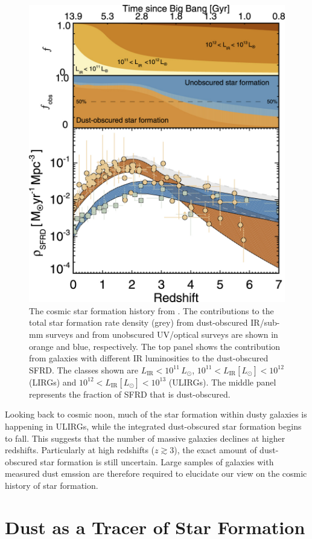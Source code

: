 \begin{figure}
    \centering
	\includegraphics[width=0.75\columnwidth]{Figures/cosmic_sfrd.jpeg}
	\caption{The cosmic star formation history from \citealt{Zavala_2021}. The contributions to the total star formation rate density (grey) from dust-obscured IR/sub-mm surveys and from unobscured UV/optical surveys are shown in orange and blue, respectively. The top panel shows the contribution from galaxies with different IR luminosities to the dust-obscured SFRD. The classes shown are $L_\textrm{IR} < 10^{11}\,L_\odot$, $10^{11} < L_\textrm{IR} [L_\odot] < 10^{12}$ (LIRGs) and $10^{12} < L_\textrm{IR} [L_\odot] < 10^{13}$ (ULIRGs). The middle panel represents the fraction of SFRD that is dust-obscured.}
	\label{fig:cosmic_sfrd}
\end{figure}

Looking back to cosmic noon, much of the star formation within dusty galaxies is happening in ULIRGs, while the integrated dust-obscured star formation begins to fall. This suggests that the number of massive galaxies declines at higher redshifts. Particularly at high redshifts ($z \gtrsim 3$), the exact amount of dust-obscured star formation is still uncertain. Large samples of galaxies with measured dust emssion are therefore required to elucidate our view on the cosmic history of star formation.

\section{Dust as a Tracer of Star Formation}

